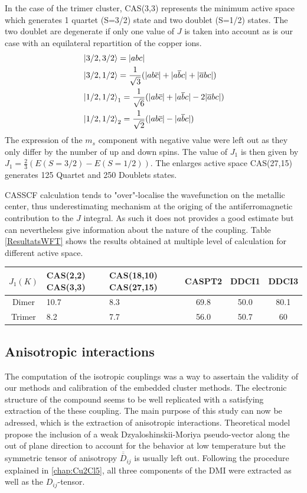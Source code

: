 \documentclass[10pt]{report}
\numberwithin{equation}{section}
\begin{document}
In the case of the trimer cluster, CAS(3,3) represents the minimum active space which generates 1 quartet (S=3/2) state and two doublet (S=1/2) states. The two doublet are degenerate if only one value of $J$ is taken into account as is our case with an equilateral repartition of the copper ions.
\begin{align}
    &\ket{3/2,3/2}=|abc|\\
    &\ket{3/2,1/2}=\frac{1}{\sqrt{3}}(|ab\overline{c}|+|a\overline{b}c|+|\overline{a}bc|)\\
    &\ket{1/2,1/2}_1=\frac{1}{\sqrt{6}}(|ab\overline{c}|+|a\overline{b}c|-2|\overline{a}bc|)\\
    &\ket{1/2,1/2}_2=\frac{1}{\sqrt{2}}(|ab\overline{c}|-|a\overline{b}c|)
\end{align}
The expression of the $m_s$ component with negative value were left out as they only differ by the number of up and down spins.
The value of $J_1$ is then given by $J_1=\frac{2}{3}(E(S=3/2)-E(S=1/2))$.
The enlarges active space CAS(27,15) generates 125 Quartet and 250 Doublets states.

CASSCF calculation tends to "over"-localise the wavefunction on the metallic center, thus underestimating mechanism at the origing of the antiferromagnetic contribution to the $J$ integral.
As such it does not provides a good estimate but can nevertheless give information about the nature of the coupling.
Table \ref{ResultatsWFT} shows the results obtained at multiple level of calculation for different active space.

\begin{center}\label{ResultatsWFT}
    \begin{tabular}{c m{8em} m{10em} c c c }
        \hline
        $J_1 (K)$ & CAS(2,2) CAS(3,3) & CAS(18,10) CAS(27,15) & CASPT2 & DDCI1  & DDCI3  \\
        \hline
        Dimer & 10.7 & 8.3 & 69.8 & 50.0 & 80.1 \\
        Trimer & 8.2 & 7.7 & 56.0  & 50.7 & 60 \\
        \hline
    \end{tabular}
\end{center}


\subsection{Anisotropic interactions}

The computation of the isotropic couplings was a way to assertain the validity of our methods and calibration of the embedded cluster methods.
The electronic structure of the compound seems to be well replicated with a satisfying extraction of the these coupling.
The main purpose of this study can now be adressed, which is the extraction of anisotropic interactions.
Theoretical model propose the inclusion of a weak Dzyaloshinskii-Moriya pseudo-vector along the out of plane direction to account for the behavior at low temperature but the symmetric tensor of anisotropy $\overline{\overline{D}}_{ij}$ is usually left out.
Following the procedure explained in \ref{chap:Cu2Cl5}, all three components of the DMI were extracted as well as the $D_{ij}$-tensor.
\end{document}
